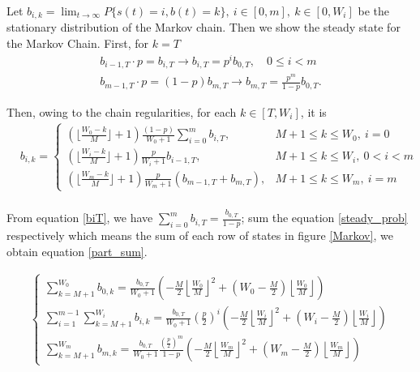 Let $b_{i,k} = \lim_{t\rightarrow \infty} P\lbrace s(t) = i, b(t) = k\rbrace,\ i\in [0,m], \ k \in [0,W_i]$ be the stationary distribution of the Markov chain. Then we show the steady state for the Markov Chain.
First,  for $k = T$
\begin{align}
b_{i-1,T}\cdot p = b_{i,T} 		\rightarrow b_{i,T} = p^i b_{0,T}, \quad 0\leq i < m\\
b_{m-1,T}\cdot p = (1-p) b_{m,T}	\rightarrow b_{m,T} = \frac{p^m}{1-p}b_{0,T}.
\label{biT}
\end{align}

Then, owing to the chain regularities, for each $k\in [T, W_i]$, it is 
\begin{align}
&b_{i,k} = 
\begin{cases}
(\lfloor \frac{W_0-k}{M} \rfloor+1)\frac{(1-p)}{W_0+1}\sum_{i=0}^m b_{i,T}, \  &M+1\leq k\leq W_0,\ i = 0\\[3pt] \nonumber
(\lfloor \frac{W_i-k}{M} \rfloor+1)\frac{p}{W_i+1}b_{i-1,T}, 				\	& M+1 \leq k\leq W_i, \ 0<i<m \\[3pt]
(\lfloor \frac{W_m-k}{M} \rfloor+1)\frac{p}{W_m+1} (b_{m-1,T}+b_{m,T}),  & M+1 \leq k\leq W_m, \ i = m \nonumber 	
\end{cases}
\\
\label{steady_prob}
\end{align}

From equation \ref{biT}, we have $\sum_{i=0}^m b_{i,T}= \frac{b_{0,T}}{1-p}$; sum the equation \ref{steady_prob} respectively which means the sum of each row of states in figure \ref{Markov}, we obtain equation \ref{part_sum}.  

\begin{align}
\begin{cases}
\sum_{k=M+1}^{W_0} b_{0,k} = \frac{b_{0,T}}{W_0+1}\left(-\frac{M}{2}\left\lfloor \frac{W_0}{M}\right\rfloor ^2 + \left(W_0-\frac{M}{2}\right)\left\lfloor \frac{W_0}{M} \right\rfloor \right) \\[3pt]
\sum_{i=1}^{m-1}\sum_{k=M+1}^{W_i} b_{i,k} = \frac{b_{0,T}}{W_0+1}\left(\frac{p}{2}\right)^i \left(-\frac{M}{2}\left\lfloor \frac{W_i}{M}\right\rfloor ^2 + \left(W_i-\frac{M}{2}\right)\left\lfloor \frac{W_i}{M} \right\rfloor \right) \\[3pt]
\sum_{k=M+1}^{W_m} b_{m,k} = \frac{b_{0,T}}{W_0+1}\frac{(\frac{p}{2})^m}{1-p}\left(-\frac{M}{2}\left\lfloor \frac{W_m}{M}\right\rfloor ^2 + \left(W_m-\frac{M}{2}\right)\left\lfloor \frac{W_m}{M} \right\rfloor \right) 
\end{cases}
\label{part_sum}
\end{align}

